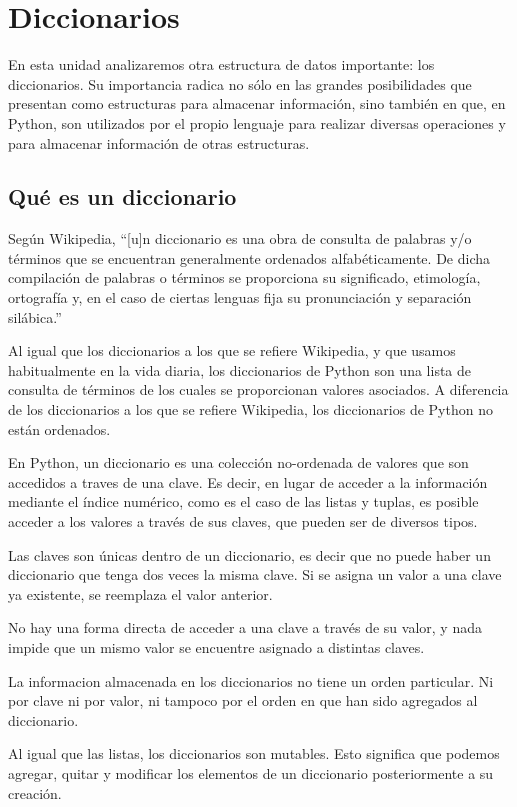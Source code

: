 \chapter{Diccionarios}

En esta unidad analizaremos otra estructura de datos importante: los diccionarios.
Su importancia radica no sólo en las grandes posibilidades que presentan
como estructuras para almacenar información, sino también en que, en
Python, son utilizados por el propio lenguaje para realizar diversas
operaciones y para almacenar información de otras estructuras.

\section{Qué es un diccionario}

Según Wikipedia, ``[u]n diccionario es una obra de consulta de
palabras y/o términos que se encuentran generalmente ordenados
alfabéticamente. De dicha compilación de palabras o términos se
proporciona su significado, etimología, ortografía y, en el caso
de ciertas lenguas fija su pronunciación y separación silábica.''


Al igual que los diccionarios a los que se refiere Wikipedia, y
que usamos habitualmente en la vida diaria, los diccionarios de
Python son una lista de consulta de términos de los cuales se
proporcionan valores asociados. A diferencia de los diccionarios a
los que se refiere Wikipedia, los diccionarios de Python no están
ordenados.


En Python, un diccionario es una colección no-ordenada de valores
que son accedidos a traves de una clave.  Es decir, en lugar de
acceder a la información mediante el índice numérico, como es el
caso de las listas y tuplas, es posible acceder a los valores a
través de sus claves, que pueden ser de diversos tipos.

Las claves son únicas dentro de un diccionario, es decir que no puede haber
un diccionario que tenga dos veces la misma clave. Si se asigna un valor a
una clave ya existente, se reemplaza el valor anterior.

No hay una forma directa de acceder a una clave a través de su valor, y
nada impide que un mismo valor se encuentre asignado a distintas claves.

La informacion almacenada en los diccionarios no tiene un orden
particular.  Ni por clave ni por valor, ni tampoco por el orden en
que han sido agregados al diccionario.

Al igual que las listas, los diccionarios son mutables. Esto significa que
podemos agregar, quitar y modificar los elementos de un diccionario
posteriormente a su creación.

